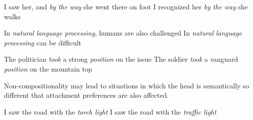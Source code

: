 \documentclass[output=paper]{langsci/langscibook}
\begin{document}

\begin{exe} 
  \ex
  \begin{xlist}
    \ex I saw her, and \textit{by the way} she went there on foot
    \ex I recognized her \textit{by the way} she walks
  \end{xlist}
  \ex
  \begin{xlist}
    \ex In \textit{natural language processing}, humans are also challenged
    \ex In \textit{natural language processing} can be difficult
  \end{xlist}
  \ex
  \begin{xlist}
    \ex The politician \textit{took} a strong \textit{position} on the issue
    \ex The soldier \textit{took} a vanguard \textit{position} on the mountain top
  \end{xlist}
\end{exe}

Non-compositionality may lead to situations in which the head is semantically so different that attachment preferences are also affected.

\begin{exe}
  \ex
  \begin{xlist}
    \ex I saw the road with the \textit{torch light}
    \ex I saw the road with the \textit{traffic light}
  \end{xlist}
\end{exe}
\end{document}
